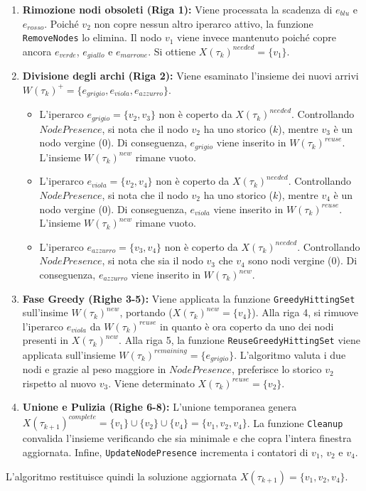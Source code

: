 \begin{enumerate}
    \item \textbf{Rimozione nodi obsoleti (Riga 1):} Viene processata la scadenza di $e_{blu}$ e $e_{rosso}$.
    Poiché $v_2$ non copre nessun altro iperarco attivo, la funzione \texttt{RemoveNodes} lo elimina.
    Il nodo $v_1$ viene invece mantenuto poiché copre ancora $e_{verde}$, $e_{giallo}$ e $e_{marrone}$.
    Si ottiene $X(\tau_k)^{needed} = \{v_1\}$.
    \item \textbf{Divisione degli archi (Riga 2):} Viene esaminato l'insieme dei nuovi arrivi $W(\tau_k)^+ = \{e_{grigio}, e_{viola}, e_{azzurro}\}$. 
    \begin{itemize}
        \item L'iperarco $e_{grigio} = \{v_2, v_3\}$ non è coperto da $X(\tau_k)^{needed}$.
        Controllando $NodePresence$, si nota che il nodo $v_2$ ha uno storico ($k$), mentre $v_3$ è un nodo vergine ($0$). Di conseguenza, $e_{grigio}$ viene inserito in $W(\tau_k)^{reuse}$. L'insieme $W(\tau_k)^{new}$ rimane vuoto.
        \item L'iperarco $e_{viola} = \{v_2, v_4\}$ non è coperto da $X(\tau_k)^{needed}$.
        Controllando $NodePresence$, si nota che il nodo $v_2$ ha uno storico ($k$), mentre $v_4$ è un nodo vergine ($0$). Di conseguenza, $e_{viola}$ viene inserito in $W(\tau_k)^{reuse}$. L'insieme $W(\tau_k)^{new}$ rimane vuoto.
        \item L'iperarco $e_{azzurro} = \{v_3, v_4\}$ non è coperto da $X(\tau_k)^{needed}$.
        Controllando $NodePresence$, si nota che sia il nodo $v_3$ che $v_4$ sono nodi vergine ($0$). Di conseguenza, $e_{azzurro}$ viene inserito in $W(\tau_k)^{new}$.
    \end{itemize}
    \item \textbf{Fase Greedy (Righe 3-5):} Viene applicata la funzione \texttt{GreedyHittingSet} sull'insime $W(\tau_k)^{new}$, portando ($X(\tau_k)^{new} = \{v_4\}$).
    Alla riga 4, si rimuove l'iperarco $e_{viola}$ da $W(\tau_k)^{reuse}$ in quanto è ora coperto da uno dei nodi presenti in $X(\tau_k)^{new}$.
    Alla riga 5, la funzione \texttt{ReuseGreedyHittingSet} viene applicata sull'insieme $W(\tau_k)^{remaining} = \{e_{grigio}\}$.
    L'algoritmo valuta i due nodi e grazie al peso maggiore in $NodePresence$, preferisce lo storico $v_2$ rispetto al nuovo $v_3$. Viene determinato $X(\tau_k)^{reuse} = \{v_2\}$.
    \item \textbf{Unione e Pulizia (Righe 6-8):} L'unione temporanea genera $X(\tau_{k+1})^{complete} = \{v_1\} \cup \{v_2\} \cup \{v_4\} = \{v_1, v_2, v_4\}$.
    La funzione \texttt{Cleanup} convalida l'insieme verificando che sia minimale e che copra l'intera finestra aggiornata.
    Infine, \texttt{UpdateNodePresence} incrementa i contatori di $v_1$, $v_2$ e $v_4$.
\end{enumerate}
L'algoritmo restituisce quindi la soluzione aggiornata $X(\tau_{k+1}) = \{v_1, v_2, v_4\}$.